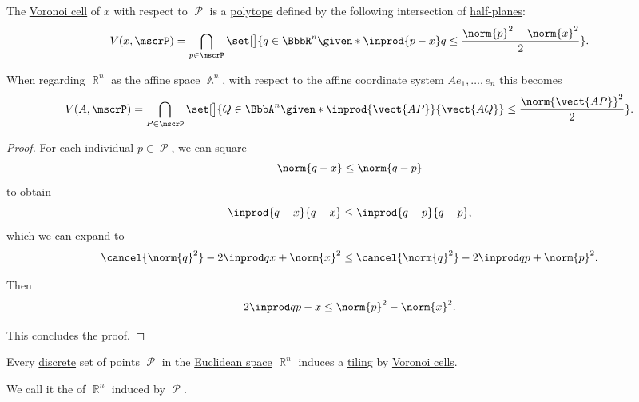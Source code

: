\begin{proposition}\label{thm:voronoi_cell_polygon}
  The \hyperref[def:voronoi_cell]{Voronoi cell} of \( x \) with respect to \( \mscrP \) is a \hyperref[def:polytope]{polytope} defined by the following intersection of \hyperref[def:half_space]{half-planes}:
  \begin{equation}\label{eq:thm:voronoi_cell_polygon}
    V(x, \mscrP) = \bigcap_{p \in \mscrP} \set[\big]{ q \in \BbbR^n \given* \inprod { p - x } q \leq \frac {\norm{p}^2 - \norm{x}^2} 2 }.
  \end{equation}

  When regarding \( \BbbR^n \) as the affine space \( \BbbA^n \), with respect to the affine coordinate system \( Ae_1,\ldots,e_n \) this becomes
  \begin{equation}\label{eq:thm:voronoi_cell_polygon/affine}
    V(A, \mscrP) = \bigcap_{P \in \mscrP} \set[\big]{ Q \in \BbbA^n \given* \inprod {\vect{AP}} {\vect{AQ}} \leq \frac {\norm{\vect{AP}}^2} 2 }.
  \end{equation}
\end{proposition}
\begin{proof}
  For each individual \( p \in \mscrP \), we can square
  \begin{equation*}
    \norm{ q - x } \leq \norm{ q - p }
  \end{equation*}
  to obtain
  \begin{equation*}
    \inprod { q - x } { q - x } \leq \inprod { q - p } { q - p },
  \end{equation*}
  which we can expand to
  \begin{equation*}
    \cancel{\norm{q}^2} - 2 \inprod q x + \norm{x}^2 \leq \cancel{\norm{q}^2} - 2 \inprod q p + \norm{p}^2.
  \end{equation*}

  Then
  \begin{equation*}
    2 \inprod q { p - x } \leq \norm{p}^2 - \norm{x}^2.
  \end{equation*}

  This concludes the proof.
\end{proof}

\begin{definition}\label{def:voronoi_tiling}\mimprovised
  Every \hyperref[def:discrete_set]{discrete} set of points \( \mscrP \) in the \hyperref[def:euclidean_space]{Euclidean space} \( \BbbR^n \) induces a \hyperref[def:topological_space_tiling]{tiling} by \hyperref[def:voronoi_cell]{Voronoi cells}.

  We call it the  of \( \BbbR^n \) induced by \( \mscrP \).
\end{definition}

